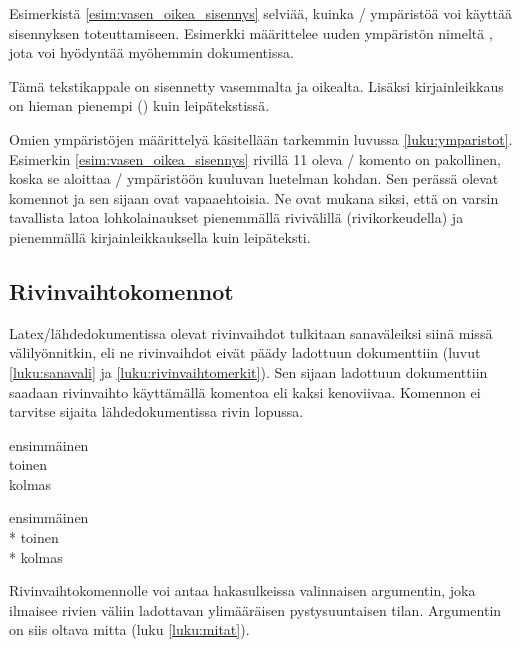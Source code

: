 Esimerkistä \ref{esim:vasen_oikea_sisennys} selviää, kuinka
\-/ ympäristöä voi käyttää sisennyksen toteuttamiseen.
Esimerkki määrittelee uuden ympäristön nimeltä
, jota voi hyödyntää myöhemmin dokumentissa.

\begin{koodilohkosis}
  \begin{lohkolainaus}
    Tämä tekstikappale on sisennetty vasemmalta ja oikealta. Lisäksi
    kirjainleikkaus on hieman pienempi (\small) kuin leipätekstissä.
  \end{lohkolainaus}
\end{koodilohkosis}

Omien ympäristöjen määrittelyä käsitellään tarkemmin luvussa
\ref{luku:ymparistot}. Esimerkin \ref{esim:vasen_oikea_sisennys} rivillä
11 oleva \-/ komento on pakollinen, koska se aloittaa
\-/ ympäristöön kuuluvan luetelman kohdan. Sen perässä
olevat komennot  ja  sen sijaan ovat
vapaaehtoisia. Ne ovat mukana siksi, että on varsin tavallista latoa
lohkolainaukset pienemmällä rivivälillä (rivikorkeudella) ja pienemmällä
kirjainleikkauksella kuin leipäteksti.

\subsection{Rivinvaihtokomennot}
\label{luku:rivinvaihtokomennot}

Latex\-/lähdedokumentissa olevat rivinvaihdot tulkitaan sanaväleiksi
siinä missä välilyönnitkin, eli ne rivinvaihdot eivät päädy ladottuun
dokumenttiin (luvut \ref{luku:sanavali} ja
\ref{luku:rivinvaihtomerkit}). Sen sijaan ladottuun dokumenttiin saadaan
rivinvaihto käyttämällä komentoa \komentom{\keno} eli kaksi kenoviivaa.
Komennon ei tarvitse sijaita lähdedokumentissa rivin lopussa.

\komentoi{\keno}
\begin{koodilohkosis}
  ensimmäinen \\ toinen \\
  kolmas
\end{koodilohkosis}

\begin{tulossis}
  ensimmäinen \\* toinen \\* kolmas
\end{tulossis}

Rivinvaihtokomennolle voi antaa hakasulkeissa valinnaisen argumentin,
joka ilmaisee rivien väliin ladottavan ylimääräisen pystysuuntaisen
tilan. Argumentin on siis oltava mitta (luku \ref{luku:mitat}).

